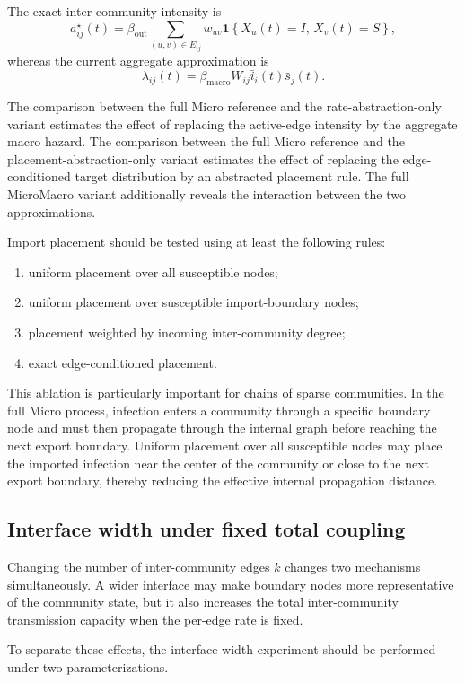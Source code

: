 \documentclass[12pt,a4paper]{article}
\begin{document}
The exact inter-community intensity is
\[
a^\star_{ij}(t)
=
\beta_{\mathrm{out}}
\sum_{(u,v)\in E_{ij}}
w_{uv}
\mathbf{1}
\left\{
X_u(t)=I,\,
X_v(t)=S
\right\},
\]
whereas the current aggregate approximation is
\[
\lambda_{ij}(t)
=
\beta_{\mathrm{macro}}
W_{ij}
\bar i_i(t)
\bar s_j(t).
\]

The comparison between the full Micro reference and the rate-abstraction-only variant estimates the effect of replacing the active-edge intensity by the aggregate macro hazard. The comparison between the full Micro reference and the placement-abstraction-only variant estimates the effect of replacing the edge-conditioned target distribution by an abstracted placement rule. The full MicroMacro variant additionally reveals the interaction between the two approximations.

Import placement should be tested using at least the following rules:
\begin{enumerate}
    \item uniform placement over all susceptible nodes;
    \item uniform placement over susceptible import-boundary nodes;
    \item placement weighted by incoming inter-community degree;
    \item exact edge-conditioned placement.
\end{enumerate}

This ablation is particularly important for chains of sparse communities. In the full Micro process, infection enters a community through a specific boundary node and must then propagate through the internal graph before reaching the next export boundary. Uniform placement over all susceptible nodes may place the imported infection near the center of the community or close to the next export boundary, thereby reducing the effective internal propagation distance.

\subsection{Interface width under fixed total coupling}

Changing the number of inter-community edges \(k\) changes two mechanisms simultaneously. A wider interface may make boundary nodes more representative of the community state, but it also increases the total inter-community transmission capacity when the per-edge rate is fixed.

To separate these effects, the interface-width experiment should be performed under two parameterizations.
\end{document}
